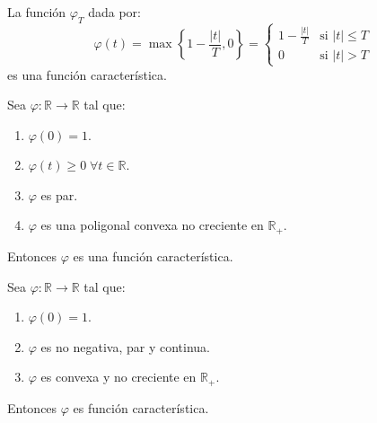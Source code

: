 \begin{proposition}
    La función $\varphi_T$ dada por:
    $$\varphi(t) = \max\left\{1-\frac{|t|}{T}, 0\right\} = \begin{cases}
            1 - \frac{|t|}{T} & \text{si } |t| \leq T \\
            0                 & \text{si } |t| > T
        \end{cases}$$
    es una función característica.
\end{proposition}

\begin{lemma}
    Sea $\varphi: \mathbb{R} \to \mathbb{R}$ tal que:
    \begin{enumerate}
        \item $\varphi(0) = 1$.
        \item $\varphi(t) \geq 0 \; \forall t \in \mathbb{R}$.
        \item $\varphi$ es par.
        \item $\varphi$ es una poligonal convexa no creciente en $\mathbb{R}_+$.
    \end{enumerate}
    Entonces $\varphi$ es una función característica.
\end{lemma}

\begin{theorem}
    Sea $\varphi: \mathbb{R} \to \mathbb{R}$ tal que:
    \begin{enumerate}
        \item $\varphi(0) = 1$.
        \item $\varphi$ es no negativa, par y continua.
        \item $\varphi$ es convexa y no creciente en $\mathbb{R}_+$.
    \end{enumerate}
    Entonces $\varphi$ es función característica.
\end{theorem}

